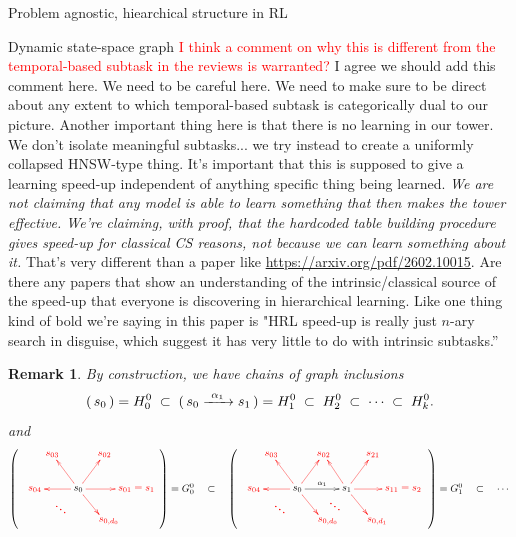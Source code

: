 \documentclass[11pt]{article}
\newtheorem{remark}[subsubsection]{Remark}
\begin{document}
\begin{section}{Problem agnostic, hiearchical structure in RL}
\begin{subsection}{Dynamic state-space graph}
\textcolor{red}{I think a comment on why this is different from the temporal-based subtask in the reviews is warranted?} {\color{blue} I agree we should add this comment here. We need to be careful here. We need to make sure to be direct about any extent to which temporal-based subtask is categorically dual to our picture. Another important thing here is that there is no learning in our tower. We don't isolate meaningful subtasks... we try instead to create a uniformly collapsed HNSW-type thing. It's important that this is supposed to give a learning speed-up independent of anything specific thing being learned. {\em We are not claiming that any model is able to learn something that then makes the tower effective. We're claiming, with proof, that the hardcoded table building procedure gives speed-up for classical CS reasons, not because we can learn something about it.} That's very different than a paper like \url{https://arxiv.org/pdf/2602.10015}. Are there any papers that show an understanding of the intrinsic/classical source of the speed-up that everyone is discovering in hierarchical learning. Like one thing kind of bold we're saying in this paper is "HRL speed-up is really just $n$-ary search in disguise, which suggest it has very little to do with intrinsic subtasks.''}
\begin{remark}
\normalfont
By construction, we have chains of graph inclusions
$$
(\ \!{\color{black} s_0}\ \!)=H^{0}_{0}\;\subset\;(\ \!{\color{black} s_0\xrightarrow{\ \alpha_{1}\ }s_1}\ \!)=H^{0}_{1}
\;\subset\; H^{0}_{2}
\;\subset\; \cdots
\;\subset\; H^{0}_{k}.
$$
and
$$
\scalebox{.9}{$
\left(\ \ 
{\color{red}
\begin{xy}
(0,0)*+{{\color{black} s_0 }}="s0";
(15,0)*+{ s_{01}=s_{1}\!\!\!\!\!\!\!\!\!\!\!\!\!\!\!\!\!}="s1";
(9,12)*+{s_{02}}="s02";
(-9,12)*+{s_{03}}="s03";
(-15,0)*+{s_{04}}="s04";
(-6,-6)*+{\pmb{\ddots}}="sd1";
(9,-11)*+{s_{0,d_{0}}\!\!\!\!\!}="sd";
{\ar@{->} "s0"; "s1"};
{\ar@{->} "s0"; "s02"};
{\ar@{->} "s0"; "s03"};
{\ar@{->} "s0"; "s04"};
{\ar@{->} "s0"; "sd"};
\end{xy}
}
\ \ \ \ \ \ \ \ \ 
\right)
=G^{0}_{0}
\quad\subset\quad
\left(\ \ 
{\color{red}
\begin{xy}
(0,0)*+{{\color{black} s_0 }}="s0";
(17,0)*+{{\color{black} s_1 }}="s1";
(9,12)*+{s_{02}}="s02";
(-9,12)*+{s_{03}}="s03";
(-15,0)*+{s_{04}}="s04";
(-6,-6)*+{\pmb{\ddots}}="sd1";
(9,-11)*+{s_{0,d_{0}}\!\!\!\!\!}="sd";
{\ar@[black]^{{\color{black} \alpha_{1}}} "s0"; "s1"};
{\ar@{->} "s0"; "s02"};
{\ar@{->} "s0"; "s03"};
{\ar@{->} "s0"; "s04"};
{\ar@{->} "s0"; "sd"};
(30,0)*+{s_{11}=s_{2}\!\!\!\!\!\!\!\!\!\!\!\!\!\!\!\!\!\!\!\!\!\!}="s2";
(26,12)*+{s_{21}}="s12";
(26,-11)*+{s_{0,d_{1}}\!\!\!\!\!}="s1d";
{\ar@{->} "s1"; "s12"};
{\ar@{->} "s1"; "s02"};
{\ar@{->} "s1"; "s2"};
{\ar@{->} "s1"; "s1d"};
(13,-5)*+{\pmb{\ddots}};
\end{xy}
}
\ \ \ \ \ \ \ \ \ \ \ \ 
\right)
=G^{0}_{1}
\quad\subset\quad\cdots$}
$$
\end{remark}


\end{subsection}
\end{section}
\end{document}
